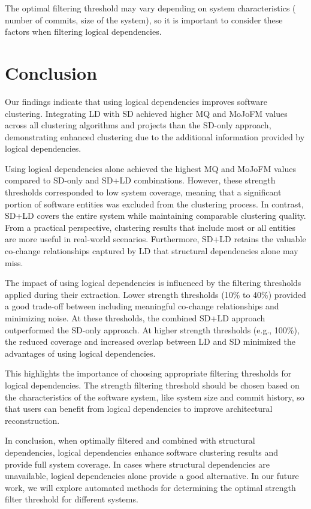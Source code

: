 \documentclass{ieeeaccess}
\begin{document}
The optimal filtering threshold may vary depending on system characteristics ( number of commits, size of the system), so it is important to consider these factors when filtering logical dependencies.


\section{Conclusion}
\label{sec:conclusion}
Our findings indicate that using logical dependencies improves software clustering. Integrating LD with SD achieved higher MQ and MoJoFM values across all clustering algorithms and projects than the SD-only approach, demonstrating enhanced clustering due to the additional information provided by logical dependencies.

Using logical dependencies alone achieved the highest MQ and MoJoFM values compared to SD-only and SD+LD combinations. However, these strength thresholds corresponded to low system coverage, meaning that a significant portion of software entities was excluded from the clustering process. In contrast, SD+LD covers the entire system while maintaining comparable clustering quality. From a practical perspective, clustering results that include most or all entities are more useful in real-world scenarios. Furthermore, SD+LD retains the valuable co-change relationships captured by LD that structural dependencies alone may miss.

The impact of using logical dependencies is influenced by the filtering thresholds applied during their extraction. Lower strength thresholds (10\% to 40\%) provided a good trade-off between including meaningful co-change relationships and minimizing noise. At these thresholds, the combined SD+LD approach outperformed the SD-only approach. At higher strength thresholds (e.g., 100\%), the reduced coverage and increased overlap between LD and SD minimized the advantages of using logical dependencies.

This highlights the importance of choosing appropriate filtering thresholds for logical dependencies. The strength filtering threshold should be chosen based on the characteristics of the software system, like system size and commit history, so that users can benefit from logical dependencies to improve architectural reconstruction.

In conclusion, when optimally filtered and combined with structural dependencies, logical dependencies enhance software clustering results and provide full system coverage. In cases where structural dependencies are unavailable, logical dependencies alone provide a good alternative. In our future work, we will explore automated methods for determining the optimal strength filter threshold for different systems.
\end{document}

